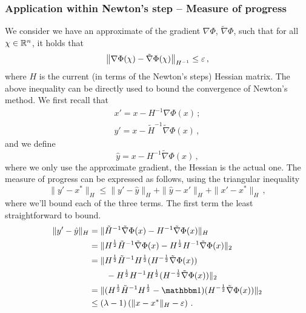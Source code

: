 \subsubsection{Application within Newton's step -- Measure of progress}
We consider we have an approximate of the gradient $\nabla \Phi$, $\tilde \nabla
\Phi$, such that for all $\chi \in \mathbb R^n$, it holds that
\begin{equation}\label{eq:approx-gradient-bound}
    \left\|\nabla \Phi (\chi) - \tilde \nabla \Phi (\chi) \right\|_{H^{-1}} \leq \varepsilon \, ,
\end{equation}
where $H$ is the current (in terms of the Newton's steps) Hessian matrix. The
above inequality can be directly used to bound the convergence of Newton's
method. We first recall that
\begin{equation*}
   \begin{aligned}
    x' = x - H^{-1}\nabla\Phi(x) \, ; \\
    y' = x - \tilde H^{-1}\tilde \nabla \Phi(x)\, ,
   \end{aligned}
\end{equation*}
and we define
\begin{equation*}
    \hat y = x - H^{-1} \tilde \nabla \Phi(x) \, ,
\end{equation*}
where we only use the approximate gradient, the Hessian is the actual one. The
measure of progress can be expressed as follows, using the triangular inequality
\begin{equation*}
    \| y'- x^* \|_H \leq \| y'- \hat y \|_H + \| \hat y - x' \|_H + \| x' - x^* \|_H \, ,
\end{equation*}
where we'll bound each of the three terms. The first term the least
straightforward to bound.
\begin{equation}\label{eq:bound-first-term}
    \begin{aligned}
        \| y' - \hat y \|_H
            & = \|\tilde H^{-1}\tilde \nabla \Phi(x) - H^{-1}\tilde \nabla \Phi(x) \|_H \\
            & = \| H^{\frac{1}{2}}\tilde H^{-1}\tilde \nabla \Phi(x) - H^{\frac{1}{2}}H^{-1}\tilde \nabla \Phi(x) \|_2 \\
            & = \| H^{\frac{1}{2}}\tilde H^{-1}H^{\frac{1}{2}}(H^{-\frac{1}{2}}\tilde \nabla \Phi(x)) \\
            & \qquad - H^{\frac{1}{2}}H^{-1}H^{\frac{1}{2}}(H^{-\frac{1}{2}}\tilde \nabla \Phi(x)) \|_2 \\
            & = \|(H^{\frac{1}{2}}\tilde H^{-1}H^{\frac{1}{2}} - \mathbbm 1) (H^{-\frac{1}{2}}\tilde \nabla \Phi(x))\|_2 \\
            & \leq (\lambda - 1) \left(\|x - x^*\|_H - \varepsilon\right) \, .
    \end{aligned}
\end{equation}

